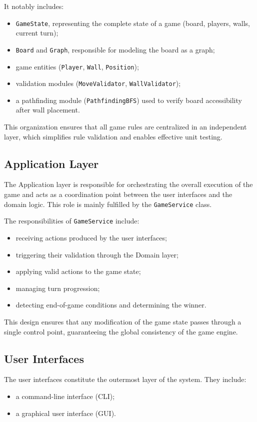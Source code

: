 \documentclass[a4paper]{article}
\begin{document}
It notably includes:
\begin{itemize}
    \item \texttt{GameState}, representing the complete state of a game (board, players, walls, current turn);
    \item \texttt{Board} and \texttt{Graph}, responsible for modeling the board as a graph;
    \item game entities (\texttt{Player}, \texttt{Wall}, \texttt{Position});
    \item validation modules (\texttt{MoveValidator}, \texttt{WallValidator});
    \item a pathfinding module (\texttt{PathfindingBFS}) used to verify board accessibility after wall placement.
\end{itemize}

This organization ensures that all game rules are centralized in an independent layer, which simplifies rule validation and enables effective unit testing.

\subsection{Application Layer}
The Application layer is responsible for orchestrating the overall execution of the game and acts as a coordination point between the user interfaces and the domain logic. This role is mainly fulfilled by the \texttt{GameService} class.

The responsibilities of \texttt{GameService} include:
\begin{itemize}
    \item receiving actions produced by the user interfaces;
    \item triggering their validation through the Domain layer;
    \item applying valid actions to the game state;
    \item managing turn progression;
    \item detecting end-of-game conditions and determining the winner.
\end{itemize}

This design ensures that any modification of the game state passes through a single control point, guaranteeing the global consistency of the game engine.

\subsection{User Interfaces}
The user interfaces constitute the outermost layer of the system. They include:
\begin{itemize}
    \item a command-line interface (CLI);
    \item a graphical user interface (GUI).
\end{itemize}
\end{document}
